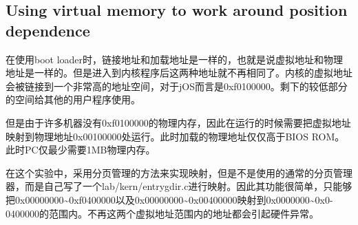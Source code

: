 \subsection{Using virtual memory to work around position dependence}
\par 在使用boot loader时，链接地址和加载地址是一样的，也就是说虚拟地址和物理地址是一样的。但是进入到内核程序后这两种地址就不再相同了。内核的虚拟地址会被链接到一个非常高的地址空间，对于jOS而言是0xf0100000。剩下的较低部分的空间给其他的用户程序使用。
\par 但是由于许多机器没有0xf0100000的物理内存，因此在运行的时候需要把虚拟地址映射到物理地址0x00100000处运行。此时加载的物理地址仅仅高于BIOS ROM。此时PC仅最少需要1MB物理内存。
\par 在这个实验中，采用分页管理的方法来实现映射，但是不是使用的通常的分页管理器，而是自己写了一个lab/kern/entrygdir.c进行映射。因此其功能很简单，只能够把0x00000000\textasciitilde 0xf0400000以及0x00000000\textasciitilde 0x00400000映射到0x0000000\textasciitilde 0x0-0400000的范围内。不再这两个虚拟地址范围内的地址都会引起硬件异常。


